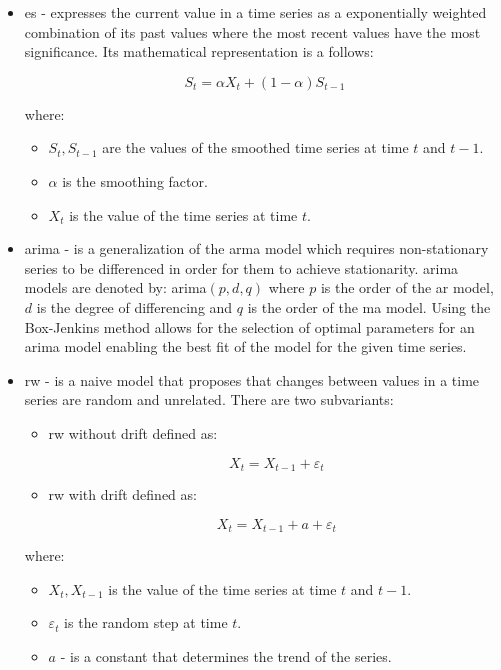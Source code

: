 \begin{itemize}
    \item \Gls{es} \cite{brown,holt} - expresses the current value in a time series as a exponentially weighted combination of its past values where the most recent values have the most significance. Its mathematical representation is a follows:

        $$S_{t} = \alpha X_{t} + (1 - \alpha)S_{t-1}$$

        where:
        \begin{itemize}
            \item $S_{t}, S_{t-1}$ are the values of the smoothed time series at time $t$ and $t-1$.
            \item $\alpha$ is the smoothing factor.
            \item $X_{t}$ is the value of the time series at time $t$.
        \end{itemize}

    \item \Gls{arima} \cite{box-jenkins} - is a generalization of the \gls{arma} model which requires non-stationary series to be differenced in order for them to achieve stationarity. \gls{arima} models are denoted by: \gls{arima}$(p, d, q)$ where $p$ is the order of the \gls{ar} model, $d$ is the degree of differencing and $q$ is the order of the \gls{ma} model. Using the Box-Jenkins method allows for the selection of optimal parameters for an \gls{arima} model enabling the best fit of the model for the given time series.
    \item \Gls{rw} \cite{meese-rogoff} - is a naive model that proposes that changes between values in a time series are random and unrelated. There are two subvariants:
        \begin{itemize}
            \item \gls{rw} without drift defined as:

                $$X_t = X_{t-1} + \varepsilon_t$$

            \item \gls{rw} with drift defined as:
        
                $$X_t = X_{t-1} + a + \varepsilon_t$$

        \end{itemize}

    where:

    \begin{itemize}
            \item $X_{t}, X_{t-1}$ is the value of the time series at time $t$ and $t - 1$.
            \item $\varepsilon_t$ is the random step at time $t$.
            \item $a$ - is a constant that determines the trend of the series.
    \end{itemize}


\end{itemize}
